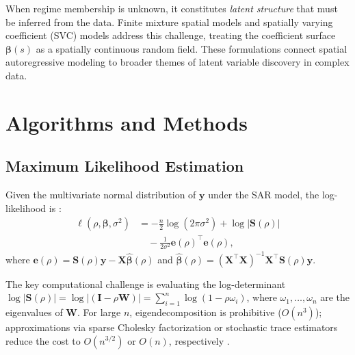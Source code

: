 \documentclass[conference]{IEEEtran}
\theoremstyle{definition}
\begin{document}
When regime membership is unknown, it constitutes \emph{latent structure} that must be inferred from the data. Finite mixture spatial models \cite{liao2014mixture} and spatially varying coefficient (SVC) models \cite{gelfand2003spatial} address this challenge, treating the coefficient surface $\bm{\beta}(s)$ as a spatially continuous random field. These formulations connect spatial autoregressive modeling to broader themes of latent variable discovery in complex data.

\section{Algorithms and Methods}
\label{sec:algo}

\subsection{Maximum Likelihood Estimation}

Given the multivariate normal distribution of $\mathbf{y}$ under the SAR model, the log-likelihood is \cite{ord1975estimation}:
\begin{align}
\ell(\rho, \bm{\beta}, \sigma^2) &= -\frac{n}{2}\log(2\pi\sigma^2) + \log|\mathbf{S}(\rho)| \nonumber\\
&\quad - \frac{1}{2\sigma^2}\bm{e}(\rho)^\top\bm{e}(\rho),
\label{eq:loglik}
\end{align}
where $\bm{e}(\rho) = \mathbf{S}(\rho)\mathbf{y} - \mathbf{X}\hat{\bm{\beta}}(\rho)$ and $\hat{\bm{\beta}}(\rho) = (\mathbf{X}^\top\mathbf{X})^{-1}\mathbf{X}^\top\mathbf{S}(\rho)\mathbf{y}$.

The key computational challenge is evaluating the log-determinant $\log|\mathbf{S}(\rho)| = \log|(\mathbf{I} - \rho\mathbf{W})| = \sum_{i=1}^n \log(1 - \rho\omega_i)$, where $\omega_1, \ldots, \omega_n$ are the eigenvalues of $\mathbf{W}$. For large $n$, eigendecomposition is prohibitive ($O(n^3)$); approximations via sparse Cholesky factorization or stochastic trace estimators reduce the cost to $O(n^{3/2})$ or $O(n)$, respectively \cite{barry1999monte,pace1997sparse}.
\end{document}
